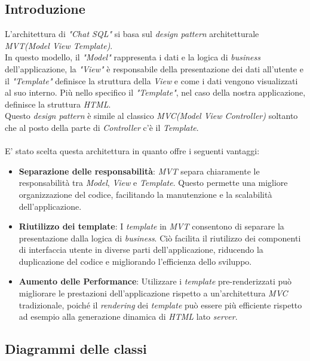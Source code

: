 \documentclass[5pt]{article}
\begin{document}
	\subsection{Introduzione}
L'architettura di \textit{"Chat SQL"} si basa sul \textit{design pattern} architetturale \textit{MVT(Model View Template)}.\\
In questo modello, il \textit{"Model"} rappresenta i dati e la logica di \textit{business} dell'applicazione, la \textit{"View"} è responsabile della presentazione dei dati all'utente e il \textit{"Template"} definisce la struttura della \textit{View} e come i dati vengono visualizzati al suo interno. Più nello specifico il \textit{"Template"}, nel caso della nostra applicazione, definisce la struttura \textit{HTML}.\\
Questo \textit{design pattern} è simile al classico \textit{MVC(Model View Controller)} soltanto che al posto della parte di \textit{Controller} c'è il \textit{Template}.\\\\
E' stato scelta questa architettura in quanto offre i seguenti vantaggi:
\begin{itemize}
    \item \textbf{Separazione delle responsabilità}: \textit{MVT} separa chiaramente le responsabilità tra \textit{Model}, \textit{View} e \textit{Template}. Questo permette una migliore organizzazione del codice, facilitando la manutenzione e la scalabilità dell'applicazione.

    \item \textbf{Riutilizzo dei template}: I \textit{template} in \textit{MVT} consentono di separare la presentazione dalla logica di \textit{business}. Ciò facilita il riutilizzo dei componenti di interfaccia utente in diverse parti dell'applicazione, riducendo la duplicazione del codice e migliorando l'efficienza dello sviluppo.

    \item \textbf{Aumento delle Performance}: Utilizzare i \textit{template} pre-renderizzati può migliorare le prestazioni dell'applicazione rispetto a un'architettura \textit{MVC} tradizionale, poiché il \textit{rendering} dei \textit{template} può essere più efficiente rispetto ad esempio alla generazione dinamica di \textit{HTML} lato \textit{server}.

\end{itemize}
	
	\subsection{Diagrammi delle classi}
	
\end{document}
